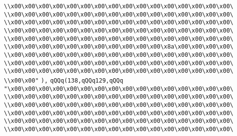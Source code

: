 \verb|\\x00\x00\x00\x00\x00\x00\x00\x00\x00\x00\x00\x00\x00\x00\x00\x00\|\newline
\verb|\\x00\x00\x00\x00\x00\x00\x00\x00\x00\x00\x00\x00\x00\x00\x00\x00\|\newline
\verb|\\x00\x00\x00\x00\x00\x00\x00\x00\x00\x00\x00\x00\x00\x00\x00\x00\|\newline
\verb|\\x00\x00\x00\x00\x00\x00\x00\x00\x00\x00\x00\x00\x00\x00\x00\x00\|\newline
\verb|\\x00\x00\x00\x00\x00\x00\x00\x00\x00\x00\x00\x00\x00\x00\x00\x00\|\newline
\verb|\\x00\x00\x00\x00\x00\x00\x00\x00\x00\x00\x00\x8a\x00\x00\x00\x00\|\newline
\verb|\\x00\x00\x00\x00\x00\x00\x00\x00\x00\x00\x00\x00\x00\x00\x00\x00\|\newline
\verb|\\x00\x00\x00\x00\x00\x00\x00\x00\x00\x00\x00\x00\x00\x00\x00\x00\|\newline
\verb|\\x00\x00\x00\x00\x00\x00\x00\x00\x00\x00\x00\x00\x00\x00\x00\x00\|\newline
\verb|\\x00\x00"|\newline
\verb|),|\newline
\verb|qQQq(138,qQQq129,qQQq|\newline
\verb|"\x00\x00\x00\x00\x00\x00\x00\x00\x00\x00\x00\x00\x00\x00\x00\x00\|\newline
\verb|\\x00\x00\x00\x00\x00\x00\x00\x00\x00\x00\x00\x00\x00\x00\x00\x00\|\newline
\verb|\\x00\x00\x00\x00\x00\x00\x00\x00\x00\x00\x00\x00\x00\x00\x00\x00\|\newline
\verb|\\x00\x00\x00\x00\x00\x00\x00\x00\x00\x00\x00\x00\x00\x00\x00\x00\|\newline
\verb|\\x00\x00\x00\x00\x00\x00\x00\x00\x00\x00\x00\x00\x00\x00\x00\x00\|\newline
\verb|\\x00\x00\x00\x00\x00\x00\x00\x00\x00\x00\x00\x00\x00\x00\x00\x00\|\newline
